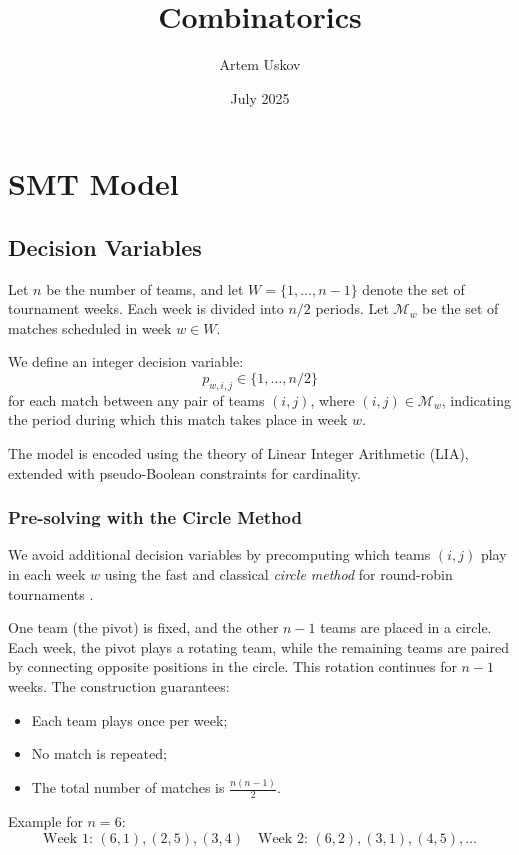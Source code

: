\documentclass{article}
\title{Combinatorics}
\author{Artem Uskov}
\date{July 2025}
\begin{document}

\section{SMT Model}

\subsection{Decision Variables}

Let $n$ be the number of teams, and let $W = \{1, \dots, n - 1\}$ denote the set of tournament weeks. Each week is divided into $n/2$ periods. Let $\mathcal{M}_w$ be the set of matches scheduled in week $w \in W$.

We define an integer decision variable:
\[
p_{w,i,j} \in \{1, \dots, n/2\}
\]
for each match between any pair of teams $(i,j)$, where $(i,j) \in \mathcal{M}_w$, indicating the period during which this match takes place in week $w$.

The model is encoded using the theory of Linear Integer Arithmetic (LIA), extended with pseudo-Boolean constraints for cardinality.

\subsubsection{Pre-solving with the Circle Method}

We avoid additional decision variables by precomputing which teams $(i, j)$ play in each week $w$ using the fast and classical \emph{circle method} for round-robin tournaments \cite{dewerra1999}.

One team (the pivot) is fixed, and the other $n - 1$ teams are placed in a circle. Each week, the pivot plays a rotating team, while the remaining teams are paired by connecting opposite positions in the circle. This rotation continues for $n - 1$ weeks. The construction guarantees:
\begin{itemize}
    \item Each team plays once per week;
    \item No match is repeated;
    \item The total number of matches is $\frac{n(n-1)}{2}$.
\end{itemize}

Example for $n = 6$:
\[
\text{Week 1: } (6,1), (2,5), (3,4) \quad \text{Week 2: } (6,2), (3,1), (4,5), \dots
\]
\end{document}
